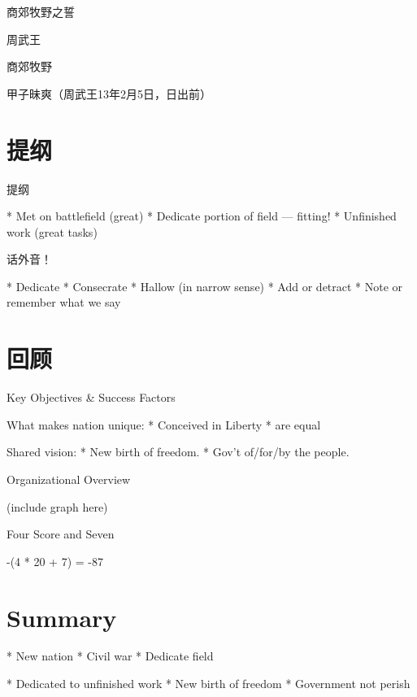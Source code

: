 \documentclass{beamer}
\begin{document}
商郊牧野之誓

周武王

商郊牧野

甲子昧爽（周武王13年2月5日，日出前）

\section{提纲}

提纲

  * Met on battlefield (great)
  * Dedicate portion of field --- fitting!
  * Unfinished work (great tasks)

话外音！

  * Dedicate
  * Consecrate
  * Hallow (in narrow sense)
  * Add or detract
  * Note or remember what we say

\section{回顾}

Key Objectives \& Success Factors

What makes nation unique:
  * Conceived in Liberty
  * are equal

Shared vision:
  * New birth of freedom.
  * Gov't of/for/by the people.

Organizational Overview

(include graph here)

Four Score and Seven

-(4 * 20 + 7) = -87

\section{Summary}

* New nation
* Civil war
* Dedicate field

* Dedicated to unfinished work
* New birth of freedom
* Government not perish
\end{document}
